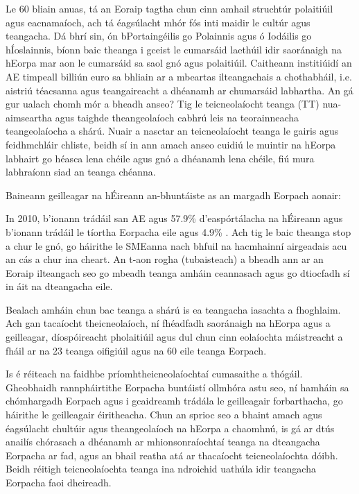 \begin{multicols}{2}
Le 60 bliain anuas, tá an Eoraip tagtha chun cinn amhail struchtúr polaitiúil agus eacnamaíoch, ach tá éagsúlacht mhór fós inti maidir le cultúr agus teangacha. Dá bhrí sin, ón bPortaingéilis go Polainnis agus ó Iodáilis go hÍoslainnis, bíonn baic theanga i gceist le cumarsáid laethúil idir saoránaigh na hEorpa mar aon le cumarsáid sa saol gnó agus polaitiúil. Caitheann institiúidí an AE timpeall billiún euro sa bhliain ar a mbeartas ilteangachais a chothabháil, i.e. aistriú téacsanna agus teangaireacht a dhéanamh ar chumarsáid labhartha. An gá gur ualach chomh mór a bheadh anseo? Tig le teicneolaíocht teanga (TT) nua-aimseartha agus taighde theangeolaíoch cabhrú leis na teorainneacha teangeolaíocha a shárú. Nuair a nasctar an teicneolaíocht teanga le gairis agus feidhmchláir chliste, beidh sí in ann amach anseo cuidiú le muintir na hEorpa labhairt go héasca lena chéile agus gnó a dhéanamh lena chéile, fiú mura labhraíonn siad an teanga chéanna.  


Baineann geilleagar na hÉireann an-bhuntáiste as an margadh Eorpach aonair: 

In 2010, b’ionann trádáil san AE agus 57.9\% d’easpórtálacha na hÉireann agus b’ionann trádáil le tíortha Eorpacha eile agus 4.9\% \cite{csoirishtrade}.
Ach tig le baic theanga stop a chur le gnó, go háirithe le SMEanna nach bhfuil na hacmhainní airgeadais acu an cás a chur ina cheart.
An t-aon rogha (tubaisteach) a bheadh ann ar an Eoraip ilteangach seo go mbeadh teanga amháin ceannasach agus go dtiocfadh sí in áit na dteangacha eile.

Bealach amháin chun bac teanga a shárú is ea teangacha iasachta a fhoghlaim. Ach gan tacaíocht theicneolaíoch, ní fhéadfadh saoránaigh na hEorpa agus a geilleagar, díospóireacht pholaitiúil agus dul chun cinn eolaíochta máistreacht a fháil ar na 23 teanga oifigiúil agus na 60 eile teanga Eorpach. 

Is é réiteach na faidhbe príomhtheicneolaíochtaí cumasaithe a thógáil. Gheobhaidh rannpháirtithe Eorpacha buntáistí ollmhóra astu seo, ní hamháin sa chómhargadh Eorpach agus i gcaidreamh trádála le geilleagair forbarthacha, go háirithe le geilleagair éiritheacha.  Chun an sprioc seo a bhaint amach agus éagsúlacht chultúir agus theangeolaíoch na hEorpa a chaomhnú, is gá ar dtús anailís chórasach a dhéanamh ar mhionsonraíochtaí teanga na dteangacha Eorpacha ar fad, agus an bhail reatha atá ar thacaíocht teicneolaíochta dóibh. Beidh réitigh teicneolaíochta teanga ina ndroichid uathúla idir teangacha Eorpacha faoi dheireadh.  


\end{multicols}
